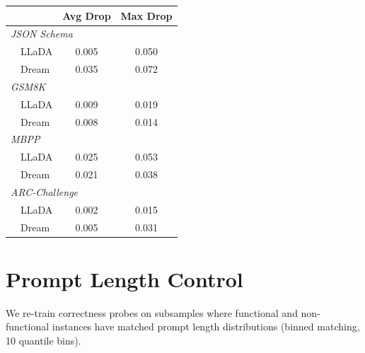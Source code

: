\documentclass[11pt]{article}
\providecommand{\linenumbers}{}
\providecommand{\nolinenumbers}{}
\begin{document}
\nolinenumbers
\begin{center}
  \small
  \label{tab:nested_cv}
  \begin{tabular}{lcc}
    \toprule
    & \textbf{Avg Drop} & \textbf{Max Drop} \\
    \midrule
    \multicolumn{3}{l}{\textit{JSON Schema}} \\
    ~~LLaDA & 0.005 & 0.050 \\
    ~~Dream & 0.035 & 0.072 \\
    \midrule
    \multicolumn{3}{l}{\textit{GSM8K}} \\
    ~~LLaDA & 0.009 & 0.019 \\
    ~~Dream & 0.008 & 0.014 \\
    \midrule
    \multicolumn{3}{l}{\textit{MBPP}} \\
    ~~LLaDA & 0.025 & 0.053 \\
    ~~Dream & 0.021 & 0.038 \\
    \midrule
    \multicolumn{3}{l}{\textit{ARC-Challenge}} \\
    ~~LLaDA & 0.002 & 0.015 \\
    ~~Dream & 0.005 & 0.031 \\
    \bottomrule
  \end{tabular}
\end{center}
\linenumbers

\section{Prompt Length Control}
\label{sec:appendix_prompt_length}

We re-train correctness probes on subsamples where functional and non-functional instances have matched prompt length distributions (binned matching, 10 quantile bins).
\end{document}
